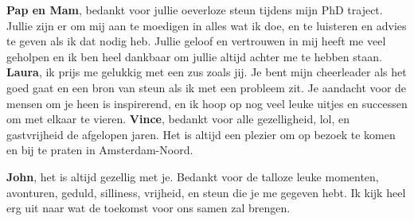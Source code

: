 \textbf{Pap en Mam}, bedankt voor jullie oeverloze steun tijdens mijn PhD traject. Jullie zijn er om mij aan te moedigen in alles wat ik doe, en te luisteren en advies te geven als ik dat nodig heb. Jullie geloof en vertrouwen in mij heeft me veel geholpen en ik ben heel dankbaar om jullie altijd achter me te hebben staan. 
\textbf{Laura}, ik prijs me gelukkig met een zus zoals jij. Je bent mijn cheerleader als het goed gaat en een bron van steun als ik met een probleem zit. Je aandacht voor de mensen om je heen is inspirerend, en ik hoop op nog veel leuke uitjes en successen om met elkaar te vieren. \textbf{Vince}, bedankt voor alle gezelligheid, lol, en gastvrijheid de afgelopen jaren. Het is altijd een plezier om op bezoek te komen en bij te praten in Amsterdam-Noord. 

\textbf{John}, het is altijd gezellig met je. Bedankt voor de talloze leuke momenten, avonturen, geduld, silliness, vrijheid, en steun die je me gegeven hebt. Ik kijk heel erg uit naar wat de toekomst voor ons samen zal brengen.  





